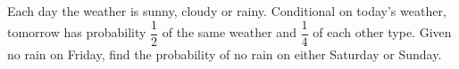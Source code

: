Each day the weather is sunny, cloudy or rainy. Conditional on today's weather, tomorrow has probability $\dfrac{1}{2}$ of the same weather and $\dfrac{1}{4}$ of each other type. Given no rain on Friday, find the probability of no rain on either Saturday or Sunday.
